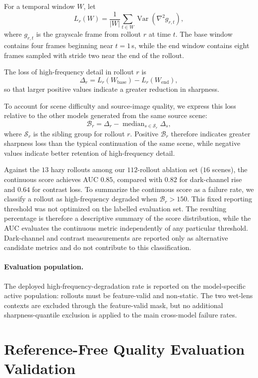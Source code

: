 For a temporal window \(W\), let
\[
L_r(W)
=
\frac{1}{|W|}
\sum_{t\in W}
\operatorname{Var}\!\left(\nabla^2 g_{r,t}\right),
\]
where \(g_{r,t}\) is the grayscale frame from rollout \(r\) at time \(t\).
The base window contains four frames beginning near \(t=1\)\,s, while the
end window contains eight frames sampled with stride two near the end of the
rollout.

The loss of high-frequency detail in rollout \(r\) is
\[
\Delta_r
=
L_r(W_{\mathrm{base}})
-
L_r(W_{\mathrm{end}}),
\]
so that larger positive values indicate a greater reduction in sharpness.

To account for scene difficulty and source-image quality, we express this
loss relative to the other models generated from the same source scene:
\[
\mathcal B_r
=
\Delta_r
-
\operatorname{median}_{s\in\mathcal S_r}\Delta_s,
\]
where \(\mathcal S_r\) is the sibling group for rollout \(r\). Positive
\(\mathcal B_r\) therefore indicates greater sharpness loss than the typical
continuation of the same scene, while negative values indicate better
retention of high-frequency detail.

Against the $13$ hazy rollouts among our $112$-rollout ablation set ($16$ scenes),
the continuous score achieves AUC $0.85$, compared with $0.82$ for dark-channel
rise and $0.64$ for contrast loss. To summarize the continuous score as a failure rate, we classify a rollout as
high-frequency degraded when $\mathcal B_r>150$. This fixed reporting
threshold was not optimized on the labelled evaluation set. The resulting
percentage is therefore a descriptive summary of the score distribution,
while the AUC evaluates the continuous metric independently of any particular
threshold. Dark-channel and contrast measurements are reported only as
alternative candidate metrics and do not contribute to this classification.

\paragraph{Evaluation population.}
The deployed high-frequency-degradation rate is reported on the model-specific
active population: rollouts must be feature-valid and non-static. The two
wet-lens contexts are excluded through the feature-valid mask, but no
additional sharpness-quantile exclusion is applied to the main cross-model
failure rates.

\section{Reference-Free Quality Evaluation Validation}
\label{app:quality_validation}

